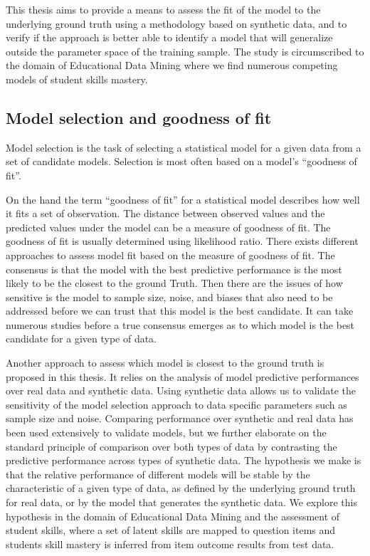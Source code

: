 This thesis aims to provide a means to assess the fit of the model to the underlying ground truth using a methodology based on synthetic data, and to verify if the approach is better able to identify a model that will generalize outside the parameter space of the training sample.  The study is circumscribed to the domain of Educational Data Mining where we find numerous competing models of student skills mastery.

\subsection{Model selection and goodness of fit}

Model selection is the task of selecting a statistical model for a given data from a set of candidate models.  Selection is most often based on a model's ``goodness of fit''.

On the hand the term ``goodness of fit''  for a statistical model describes how well it fits a set of observation. The distance between observed values and the predicted values under the model can be a measure of goodness of fit. The goodness of fit is usually determined using likelihood ratio. There exists different approaches to assess model fit based on the measure of goodness of fit. The consensus is that the model with the best predictive performance is the most likely to be the closest to the ground Truth. Then there are the issues of how sensitive is the model to sample size, noise, and biases that also need to be addressed before we can trust that this model is the best candidate. It can take numerous studies before a true consensus emerges as to which model is the best candidate for a given type of data.

Another approach to assess which model is closest to the ground truth is proposed in this thesis. It relies on the analysis of model predictive performances over real data and synthetic data. Using synthetic data allows us to validate the sensitivity of the model selection approach to data specific parameters such as sample size and noise. Comparing performance over synthetic and real data has been used extensively to validate models, but we further elaborate on the standard principle of comparison over both types of data by contrasting the predictive performance across types of synthetic data.  The hypothesis we make is that the relative performance of different models will be stable by the characteristic of a given type of data, as defined by the underlying ground truth for real data, or by the model that generates the synthetic data.  We explore this hypothesis in the domain of Educational Data Mining and the assessment of student skills, where a set of latent skills are mapped to question items and students skill mastery is inferred from item outcome results from test data. 



